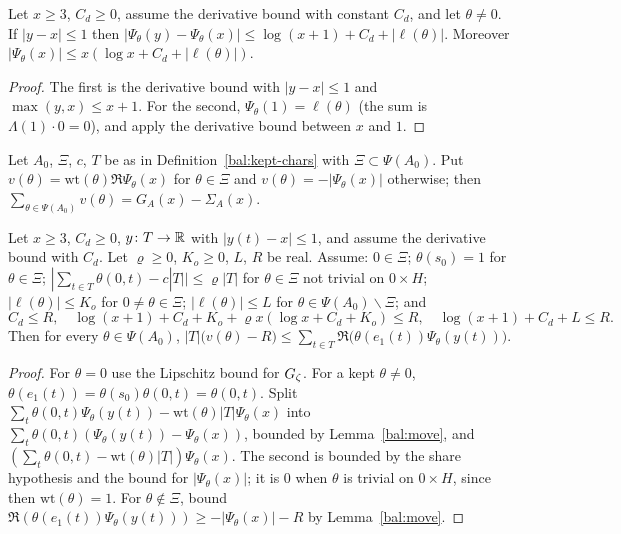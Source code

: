 \begin{lemma}\label{bal:move}
Let $x\ge3$, $C_d\ge0$, assume the derivative bound with constant $C_d$, and let $\theta\ne0$. If $|y-x|\le1$ then $|\Psi_{\theta}(y)-\Psi_{\theta}(x)|\le\log(x+1)+C_d+|\ell(\theta)|$. Moreover $|\Psi_{\theta}(x)|\le x(\log x+C_d+|\ell(\theta)|)$.
\end{lemma}
\begin{proof}
The first is the derivative bound with $|y-x|\le1$ and $\max(y,x)\le x+1$. For the second, $\Psi_{\theta}(1)=\ell(\theta)$ (the sum is $\Lambda(1)\cdot0=0$), and apply the derivative bound between $x$ and $1$.
\end{proof}

\begin{lemma}\label{bal:one-char}
Let $A_0$, $\Xi$, $c$, $T$ be as in Definition~\ref{bal:kept-chars} with $\Xi\subset\Psi(A_0)$. Put $v(\theta)=\mathrm{wt}(\theta)\Re\Psi_{\theta}(x)$ for $\theta\in\Xi$ and $v(\theta)=-|\Psi_{\theta}(x)|$ otherwise; then $\sum_{\theta\in\Psi(A_0)}v(\theta)=G_A(x)-\Sigma_A(x)$.

Let $x\ge3$, $C_d\ge0$, $y\colon T\to\mathbb{R}$ with $|y(t)-x|\le1$, and assume the derivative bound with $C_d$. Let $\varrho\ge0$, $K_o\ge0$, $L$, $R$ be real. Assume: $0\in\Xi$; $\theta(s_0)=1$ for $\theta\in\Xi$; $|\sum_{t\in T}\theta(0,t)-c|T||\le\varrho|T|$ for $\theta\in\Xi$ not trivial on $0\times H$; $|\ell(\theta)|\le K_o$ for $0\ne\theta\in\Xi$; $|\ell(\theta)|\le L$ for $\theta\in\Psi(A_0)\smallsetminus\Xi$; and
\[C_d\le R,\quad \log(x+1)+C_d+K_o+\varrho x(\log x+C_d+K_o)\le R,\quad \log(x+1)+C_d+L\le R.\]
Then for every $\theta\in\Psi(A_0)$,
$|T|\bigl(v(\theta)-R\bigr)\le\sum_{t\in T}\Re\bigl(\theta(e_1(t))\Psi_{\theta}(y(t))\bigr)$.
\end{lemma}
\begin{proof}
For $\theta=0$ use the Lipschitz bound for $G_{\zeta}$. For a kept $\theta\ne0$, $\theta(e_1(t))=\theta(s_0)\theta(0,t)=\theta(0,t)$. Split $\sum_t\theta(0,t)\Psi_{\theta}(y(t))-\mathrm{wt}(\theta)|T|\Psi_{\theta}(x)$ into $\sum_t\theta(0,t)(\Psi_{\theta}(y(t))-\Psi_{\theta}(x))$, bounded by Lemma~\ref{bal:move}, and $(\sum_t\theta(0,t)-\mathrm{wt}(\theta)|T|)\Psi_{\theta}(x)$. The second is bounded by the share hypothesis and the bound for $|\Psi_{\theta}(x)|$; it is $0$ when $\theta$ is trivial on $0\times H$, since then $\mathrm{wt}(\theta)=1$. For $\theta\notin\Xi$, bound $\Re(\theta(e_1(t))\Psi_{\theta}(y(t)))\ge-|\Psi_{\theta}(x)|-R$ by Lemma~\ref{bal:move}.
\end{proof}

